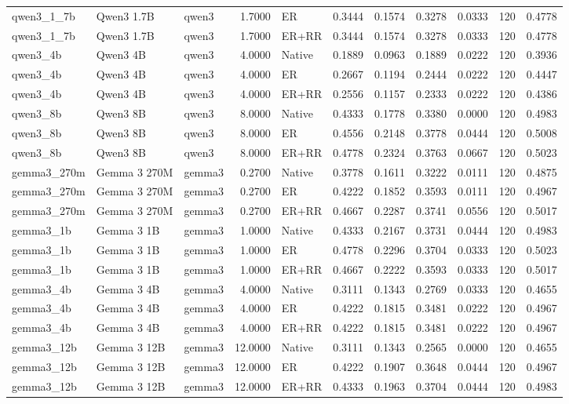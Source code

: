 \begin{tabular}{lllrllrrlrr}
qwen3_1_7b & Qwen3 1.7B & qwen3 & 1.7000 & ER & 0.3444 & 0.1574 & 0.3278 & 0.0333 & 120 & 0.4778 \\
qwen3_1_7b & Qwen3 1.7B & qwen3 & 1.7000 & ER+RR & 0.3444 & 0.1574 & 0.3278 & 0.0333 & 120 & 0.4778 \\
qwen3_4b & Qwen3 4B & qwen3 & 4.0000 & Native & 0.1889 & 0.0963 & 0.1889 & 0.0222 & 120 & 0.3936 \\
qwen3_4b & Qwen3 4B & qwen3 & 4.0000 & ER & 0.2667 & 0.1194 & 0.2444 & 0.0222 & 120 & 0.4447 \\
qwen3_4b & Qwen3 4B & qwen3 & 4.0000 & ER+RR & 0.2556 & 0.1157 & 0.2333 & 0.0222 & 120 & 0.4386 \\
qwen3_8b & Qwen3 8B & qwen3 & 8.0000 & Native & 0.4333 & 0.1778 & 0.3380 & 0.0000 & 120 & 0.4983 \\
qwen3_8b & Qwen3 8B & qwen3 & 8.0000 & ER & 0.4556 & 0.2148 & 0.3778 & 0.0444 & 120 & 0.5008 \\
qwen3_8b & Qwen3 8B & qwen3 & 8.0000 & ER+RR & 0.4778 & 0.2324 & 0.3763 & 0.0667 & 120 & 0.5023 \\
gemma3_270m & Gemma 3 270M & gemma3 & 0.2700 & Native & 0.3778 & 0.1611 & 0.3222 & 0.0111 & 120 & 0.4875 \\
gemma3_270m & Gemma 3 270M & gemma3 & 0.2700 & ER & 0.4222 & 0.1852 & 0.3593 & 0.0111 & 120 & 0.4967 \\
gemma3_270m & Gemma 3 270M & gemma3 & 0.2700 & ER+RR & 0.4667 & 0.2287 & 0.3741 & 0.0556 & 120 & 0.5017 \\
gemma3_1b & Gemma 3 1B & gemma3 & 1.0000 & Native & 0.4333 & 0.2167 & 0.3731 & 0.0444 & 120 & 0.4983 \\
gemma3_1b & Gemma 3 1B & gemma3 & 1.0000 & ER & 0.4778 & 0.2296 & 0.3704 & 0.0333 & 120 & 0.5023 \\
gemma3_1b & Gemma 3 1B & gemma3 & 1.0000 & ER+RR & 0.4667 & 0.2222 & 0.3593 & 0.0333 & 120 & 0.5017 \\
gemma3_4b & Gemma 3 4B & gemma3 & 4.0000 & Native & 0.3111 & 0.1343 & 0.2769 & 0.0333 & 120 & 0.4655 \\
gemma3_4b & Gemma 3 4B & gemma3 & 4.0000 & ER & 0.4222 & 0.1815 & 0.3481 & 0.0222 & 120 & 0.4967 \\
gemma3_4b & Gemma 3 4B & gemma3 & 4.0000 & ER+RR & 0.4222 & 0.1815 & 0.3481 & 0.0222 & 120 & 0.4967 \\
gemma3_12b & Gemma 3 12B & gemma3 & 12.0000 & Native & 0.3111 & 0.1343 & 0.2565 & 0.0000 & 120 & 0.4655 \\
gemma3_12b & Gemma 3 12B & gemma3 & 12.0000 & ER & 0.4222 & 0.1907 & 0.3648 & 0.0444 & 120 & 0.4967 \\
gemma3_12b & Gemma 3 12B & gemma3 & 12.0000 & ER+RR & 0.4333 & 0.1963 & 0.3704 & 0.0444 & 120 & 0.4983 \\
\bottomrule
\end{tabular}
